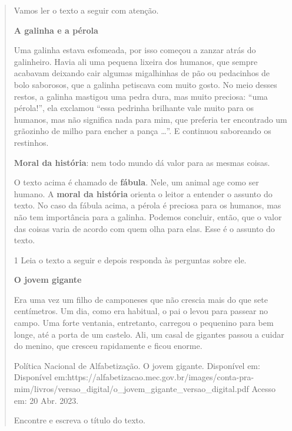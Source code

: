 \begin{verse}
{Vamos ler o texto a seguir com atenção.


\textbf{A galinha e a pérola}

Uma galinha estava esfomeada, por isso começou a zanzar atrás do
galinheiro. Havia ali uma pequena lixeira dos humanos, que sempre
acabavam deixando cair algumas migalhinhas de pão ou pedacinhos de 
bolo saborosos, que a galinha petiscava com muito gosto. No meio
desses restos, a galinha mastigou uma pedra dura, mas muito preciosa:
``uma pérola!'', ela exclamou ``essa pedrinha 
brilhante vale muito para os humanos, mas não significa nada para
mim, que  preferia ter encontrado um grãozinho de milho para encher
a pança \ldots''. E continuou saboreando os restinhos. 

\textbf{Moral da história}: nem todo mundo dá valor para as mesmas
coisas. 


O texto acima é chamado de \textbf{fábula}. Nele, um animal age
como ser humano. A \textbf{moral da história} orienta o leitor a
entender o assunto do texto. No caso da fábula acima, a pérola é
preciosa para os humanos, mas não tem importância para a galinha.
Podemos concluir, então, que o valor das coisas varia de acordo com
quem olha para elas. Esse é o assunto do texto.} 


\num{1} Leia o texto a seguir e depois responda às perguntas sobre ele. 

\textbf{O jovem gigante}

Era uma vez um filho de camponeses que não crescia mais do que sete
centímetros. Um dia, como era habitual, o pai o levou para passear no
campo. Uma forte ventania, entretanto, carregou o pequenino para bem
longe, até a porta de um castelo. Ali, um casal de gigantes passou a
cuidar do menino, que cresceu rapidamente e ficou enorme.

Política Nacional de Alfabetização. O jovem gigante. Disponível em: Disponível
em:https://alfabetizacao.mec.gov.br/images/conta-pra-mim/livros/versao_digital/o_jovem_gigante_versao_digital.pdf
Acesso em: 20 Abr. 2023.

\begin{escolha}
\item Encontre e escreva o título do texto.


\end{escolha}
\end{verse}

